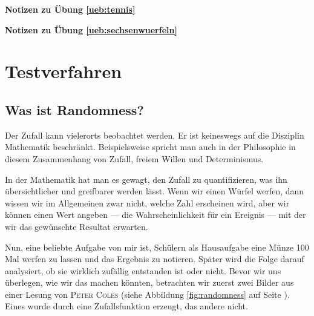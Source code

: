 \documentclass[%
<<<<<<< Updated upstream
<<<<<<< Updated upstream
11pt,%
twoside,%
titlepage,%
german,%
=======
=======
>>>>>>> Stashed changes
11pt,%
twoside,%
titlepage,%
swissgerman,%
<<<<<<< Updated upstream
>>>>>>> Stashed changes
=======
>>>>>>> Stashed changes
headsepline%
]{scrartcl}
\newcommand{\faReturnGray}{\textcolor{gray}{\faMailReply}} %
\theoremstyle{definition}
\theoremstyle{plain}
\newcommand{\concatueb}[1]{ueb:#1}%
\newcommand{\concatlsg}[1]{lsg:#1}%
\newenvironment{lsg}[1]{%
    \par\noindent\textbf{Notizen zu Übung \ref{\concatueb{#1}}}\label{\concatlsg{#1}}
    \hfill\hyperref[\concatueb{#1}]{\faReturnGray}\par %
}{%
    \par%
}
\newcommand{\concatueb}[1]{ueb:#1}%
\newcommand{\concatlsg}[1]{lsg:#1}%
\newenvironment{lsg}[1]{%
    \par\noindent\textbf{Notizen zu Übung \ref{\concatueb{#1}}.}%
    \label{\concatlsg{#1}}
}{%
    \par%
}
\begin{document}
\begin{lsg}{tennis}
\begin{lsg}{sechsenwuerfeln}
\begin{center}
\end{center}
\end{lsg}

\clearpage

\section{Testverfahren}

\subsection{Was ist Randomness?}
Der Zufall kann vielerorts beobachtet werden. Er ist keineswegs auf die Disziplin Mathematik beschränkt. Beispielsweise spricht man auch in der Philosophie in diesem Zusammenhang von Zufall, freiem Willen und Determinismus.

In der Mathematik hat man es gewagt, den Zufall zu quantifizieren, was ihn über\-sich\-tli\-cher und greifbarer werden lässt. Wenn wir einen Würfel werfen, dann wissen wir im Allgemeinen zwar nicht, welche Zahl erscheinen wird, aber wir können einen Wert angeben --- die Wahrscheinlichkeit für ein Ereignis --- mit der wir das gewünschte Resultat erwarten.

Nun, eine beliebte Aufgabe von mir ist, Schülern als Hausaufgabe eine Münze 100 Mal werfen zu lassen und das Ergebnis zu notieren. Später wird die Folge darauf analysiert, ob sie wirklich zufällig entstanden ist oder nicht. Bevor wir uns überlegen, wie wir das machen könnten, betrachten wir zuerst zwei Bilder aus einer Lesung von \textsc{Peter Coles} (siehe Abbildung \ref{fig:randomness} auf Seite \pageref{fig:randomness}). Eines wurde durch eine Zufallsfunktion erzeugt, das andere nicht.  


\end{lsg}
\end{document}

